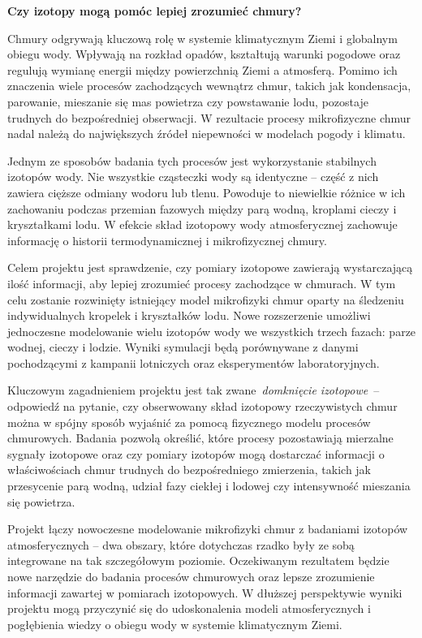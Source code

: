 \documentclass[11pt,a4paper]{article}
\newif\ifen
\begin{document}
\fi

\ifen\else

\begin{center}
\Large\textbf{Czy izotopy mogą pomóc lepiej zrozumieć chmury?}
\end{center}


Chmury odgrywają kluczową rolę w systemie klimatycznym Ziemi i globalnym obiegu wody. Wpływają na rozkład opadów, kształtują warunki pogodowe oraz regulują wymianę energii między powierzchnią Ziemi a atmosferą. Pomimo ich znaczenia wiele procesów zachodzących wewnątrz chmur, takich jak kondensacja, parowanie, mieszanie się mas powietrza czy powstawanie lodu, pozostaje trudnych do bezpośredniej obserwacji. W rezultacie procesy mikrofizyczne chmur nadal należą do największych źródeł niepewności w modelach pogody i klimatu.

Jednym ze sposobów badania tych procesów jest wykorzystanie stabilnych izotopów wody. Nie wszystkie cząsteczki wody są identyczne – część z nich zawiera cięższe odmiany wodoru lub tlenu. Powoduje to niewielkie różnice w ich zachowaniu podczas przemian fazowych między parą wodną, kroplami cieczy i kryształkami lodu. W efekcie skład izotopowy wody atmosferycznej zachowuje informację o historii termodynamicznej i mikrofizycznej chmury.

Celem projektu jest sprawdzenie, czy pomiary izotopowe zawierają wystarczającą ilość informacji, aby lepiej zrozumieć procesy zachodzące w chmurach. W tym celu zostanie rozwinięty istniejący model mikrofizyki chmur oparty na śledzeniu indywidualnych kropelek i kryształków lodu. Nowe rozszerzenie umożliwi jednoczesne modelowanie wielu izotopów wody we wszystkich trzech fazach: parze wodnej, cieczy i lodzie. Wyniki symulacji będą porównywane z danymi pochodzącymi z kampanii lotniczych oraz eksperymentów laboratoryjnych.

Kluczowym zagadnieniem projektu jest tak zwane \textit{domknięcie izotopowe} – odpowiedź na pytanie, czy obserwowany skład izotopowy rzeczywistych chmur można w spójny sposób wyjaśnić za pomocą fizycznego modelu procesów chmurowych. Badania pozwolą określić, które procesy pozostawiają mierzalne sygnały izotopowe oraz czy pomiary izotopów mogą dostarczać informacji o właściwościach chmur trudnych do bezpośredniego zmierzenia, takich jak przesycenie parą wodną, udział fazy ciekłej i lodowej czy intensywność mieszania się powietrza.

Projekt łączy nowoczesne modelowanie mikrofizyki chmur z badaniami izotopów atmosferycznych – dwa obszary, które dotychczas rzadko były ze sobą integrowane na tak szczegółowym poziomie. Oczekiwanym rezultatem będzie nowe narzędzie do badania procesów chmurowych oraz lepsze zrozumienie informacji zawartej w pomiarach izotopowych. W dłuższej perspektywie wyniki projektu mogą przyczynić się do udoskonalenia modeli atmosferycznych i pogłębienia wiedzy o obiegu wody w systemie klimatycznym Ziemi.



\fi
\end{document}
